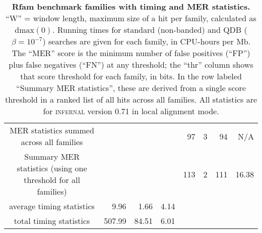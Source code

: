 \begin{table}
\begin{center}
\begin{tabular}{|ll|rr|rr|r|rr|rrrr|}
\multicolumn{6}{|c}{MER statistics summed across all families}                     & \multicolumn{3}{c|}{} & 97 & 3 & 94 & N/A \\  
\multicolumn{6}{|c}{Summary MER statistics (using one threshold for all families)} & \multicolumn{3}{c|}{} & 113 & 2 & 111 &  16.38 \\ \hline
\multicolumn{6}{|c|}{average timing statistics} & 9.96   & 1.66  & 4.14 & \multicolumn{4}{c}{} \\ 
\multicolumn{6}{|c|}{total timing statistics}   & 507.99 & 84.51 & 6.01 & \multicolumn{4}{c}{} \\ \cline{1-9}

\end{tabular}
\end{center}

\caption{\textbf{Rfam benchmark families with timing and MER statistics.}
  ``W'' = window length, maximum size of a hit per family, calculated as $\mbox{dmax}(0)$.
  Running times for standard (non-banded) and QDB ($\beta=10^{-7}$)
  searches are given for each family, in CPU-hours per Mb. The ``MER'' score
  is the minimum number of false positives (``FP'') plus false
  negatives (``FN'') at any threshold; the ``thr'' column shows that
  score threshold for each family, in bits.
  In the row labeled ``Summary MER statistics'', these are
  derived from a single score threshold in a ranked list
  of all hits across all families. All statistics are for \textsc{infernal} version 0.71 in 
  local alignment mode.}

\label{tbl:rmark}
\end{table}
